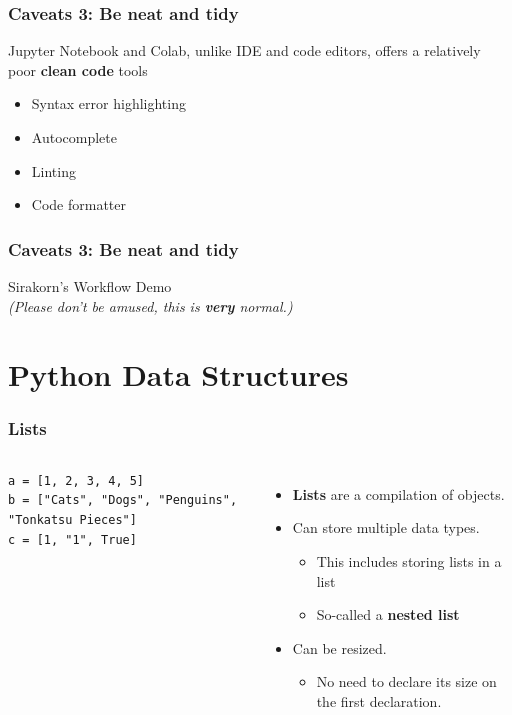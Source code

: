 \documentclass[aspectratio=169]{beamer}
\begin{document}
\begin{frame}
    \frametitle{Caveats 3: Be neat and tidy}
    Jupyter Notebook and Colab, unlike IDE and code editors, offers a relatively poor \textbf{clean code} tools
    \begin{itemize}
        \item Syntax error highlighting
        \item Autocomplete
        \item Linting
        \item Code formatter
    \end{itemize}
\end{frame}

\begin{frame}
    \frametitle{Caveats 3: Be neat and tidy}
    \centering
    {\LARGE Sirakorn's Workflow Demo}\\
     \textit{(Please don't be amused, this is \textbf{very} normal.)}
\end{frame}

\section{Python Data Structures}

\begin{frame}[fragile]
    \frametitle{Lists}
    \begin{columns}
            \begin{lstlisting}[style=defaultstyle]
a = [1, 2, 3, 4, 5]
b = ["Cats", "Dogs", "Penguins", "Tonkatsu Pieces"]
c = [1, "1", True]\end{lstlisting}
            \begin{itemize}[<+(1)->]
                \item \textbf{Lists} are a compilation of objects.
                \item Can store multiple data types.
                \begin{itemize}
                    \item This includes storing lists in a list
                    \item So-called a \textbf{nested list}
                \end{itemize}
                \item Can be resized.
                \begin{itemize}
                    \item No need to declare its size on the first declaration.
                \end{itemize}
            \end{itemize}
    \end{columns}
\end{frame}
\end{document}
